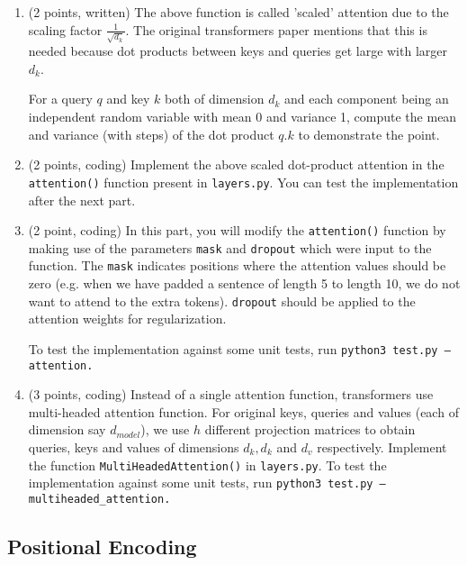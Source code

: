 \documentclass{article}
\theoremstyle{case}
\theoremstyle{definition}
\begin{document}
\begin{enumerate}

    \item (2 points, written) The above function is called 'scaled' attention due to the scaling factor $\frac{1}{\sqrt{d_k}}$. The original transformers paper mentions that this is needed because dot products between keys and queries get large with larger $d_k$.
    
    For a query $q$ and key $k$ both of dimension $d_k$ and each component being an independent random variable with mean 0 and variance 1, compute the mean and variance (with steps) of the dot product $q.k$ to demonstrate the point.

    \newpage
    \item (2 points, coding) Implement the above scaled dot-product attention in the \texttt{attention()} function present in \texttt{layers.py}. You can test the implementation after the next part.


    \newpage
    \item (2 point, coding) In this part, you will modify the \texttt{attention()} function by making use of the parameters \texttt{mask} and \texttt{dropout} which were input to the function. The \texttt{mask} indicates positions where the attention values should be zero (e.g. when we have padded a sentence of length 5 to length 10, we do not want to attend to the extra tokens). \texttt{dropout} should be applied to the attention weights for regularization.

    To test the implementation against some unit tests, run \texttt{python3 test.py --attention.}


    \newpage
    \item (3 points, coding) Instead of a single attention function, transformers use multi-headed attention function. For original keys, queries and values (each of dimension say $d_{model}$), we use $h$ different projection matrices to obtain queries, keys and values of dimensions $d_k, d_k$ and $d_v$ respectively. Implement the function \texttt{MultiHeadedAttention()} in \texttt{layers.py}. To test the implementation against some unit tests, run \texttt{python3 test.py --multiheaded\_attention.}

    
\end{enumerate}

\newpage
\subsection{Positional Encoding}
\end{document}
